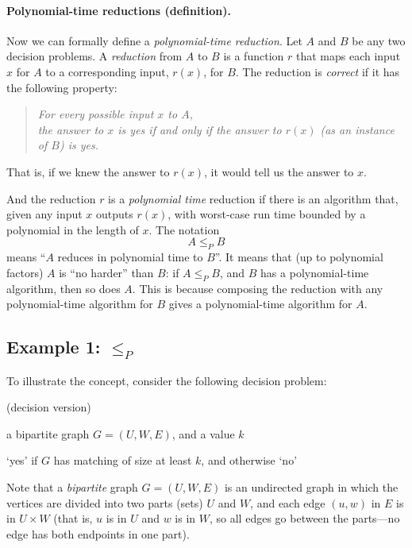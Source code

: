 \paragraph{Polynomial-time reductions (definition).}
Now we can formally define a \emph{polynomial-time reduction}.
Let $A$ and $B$ be any two decision problems.
A \emph{reduction} from $A$ to $B$ is a function $r$
that maps each input $x$ for $A$
to a corresponding input, $r(x)$, for $B$.
The reduction is \emph{correct} if it has the following property:
\begin{quote}\em
  For every possible input $x$ to $A$,
  \\\hspace*{1em}the answer to $x$ is \textsf{yes} if and only
if the answer to $r(x)$ (as an instance of $B$) is \textsf{yes}.
\end{quote}
That is, if we knew the answer to $r(x)$, it would tell us the answer to $x$.

And the reduction $r$ is a \emph{polynomial time} reduction
if there is an algorithm that, given any input $x$ outputs $r(x)$,
with worst-case run time bounded by a polynomial in the length of $x$.
The notation
\[
  A \le_P B
\]
means ``$A$ reduces in polynomial time to $B$''.
It means that (up to polynomial factors)
$A$ is ``no harder'' than $B$:
if $A \le_P B$, and $B$ has a polynomial-time algorithm, then so does $A$.
This is because composing the reduction with any polynomial-time algorithm for $B$
gives a polynomial-time algorithm for $A$.

\newpage 

\subsection{Example 1:  $\le_P$ }
To illustrate the concept, consider the following decision problem:

\begin{mylist}
\item[]  (decision version) \dotfill \em
\item[\bf input:] a bipartite graph $G=(U, W ,E)$, and a value $k$
\item[\bf output:] `\textsf{yes}' if $G$ has matching of size at least $k$, and otherwise `\textsf{no}'
\end{mylist}

Note that a \emph{bipartite} graph $G=(U, W, E)$
is an undirected graph in which the vertices are divided into two parts (sets)  $U$ and $W$,
and each edge $(u,w)$ in $E$ is in $U\times W$ (that is, $u$ is in $U$ and $w$ is in $W$, so all edges
go between the parts---no edge has both endpoints in one part).

